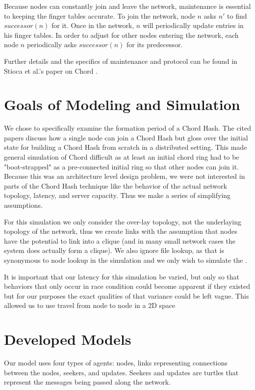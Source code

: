 \documentclass[12pt]{ieeetran} %
\begin{document}
Because nodes can constantly join and leave the network, maintenance is essential to keeping the finger tables accurate.  To join the network, node $n$ asks $n'$ to find $successor(n)$ for it.  Once in the network, $n$ will periodically update entries in his finger tables.  In order to adjust for other nodes entering the network, each node $n$ periodically asks $successor(n)$ for its predecessor. 

Further details and the specifics of maintenance and protocol can be found in Stioca et al.'s paper on Chord \cite{Chord}.



\section{Goals of Modeling and Simulation}
We chose to specifically examine the formation period of a Chord Hash. The cited papers discuss how a single node can join a Chord Hash but gloss over the initial state for building a Chord Hash from scratch in a distributed setting. This made general simulation of Chord difficult as at least an initial chord ring had to be "boot-strapped" as a pre-connected initial ring so that other nodes can join it. Because this was an architecture level design problem, we were not interested in parts of the Chord Hash technique like the behavior of the actual network topology, latency, and server capacity. Thus we make a series of simplifying assumptions.

For this simulation we only consider the over-lay topology, not the underlaying topology of the network, thus we create links with the assumption that nodes have the potential to link into a clique (and in many small network cases the system does actually form a clique).  We also ignore file lookup, as that is synonymous to node lookup in the  simulation and we only wish to simulate the .

It is important that our latency for this simulation be varied, but only so that behaviors that only occur in race condition could become apparent if they existed but for our purposes the exact qualities of that variance could be left vague. This allowed us to use travel from node to node in a 2D space


\section{Developed Models}

Our model uses four types of agents: nodes, links representing connections between the nodes, seekers, and updates.  Seekers and updates are turtles that represent the messages being passed along the network.
\end{document}
